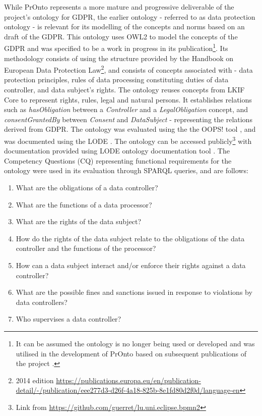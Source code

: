 While PrOnto represents a more mature and progressive deliverable of the project's ontology for GDPR, the earlier ontology - referred to as data protection ontology \cite{otake_using_2017} - is relevant for its modelling of the concepts and norms based on an draft of the GDPR. This ontology uses OWL2 to model the concepts of the GDPR and was specified to be a work in progress in its publication\footnote{It can be assumed the ontology is no longer being used or developed and was utilised in the development of PrOnto based on subsequent publications of the project \cite{bartolini_legal_2018,bartolini_enhancing_2019}.}.
Its methodology consists of using the structure provided by the Handbook on European Data Protection Law\footnote{2014 edition \url{https://publications.europa.eu/en/publication-detail/-/publication/eee277d3-d26f-4a18-825b-8e1fd80d2f0d/language-en}}, and consists of concepts associated with - data protection principles, rules of data processing constituting duties of data controller, and data subject's rights.
The ontology reuses concepts from LKIF Core \cite{hoekstra_lkif_2007} to represent rights, rules, legal and natural persons. It establishes relations such as \textit{hasObligation} between a \textit{Controller} and a \textit{LegalObligation} concept, and \textit{consentGrantedBy} between \textit{Consent} and \textit{DataSubject} - representing the relations derived from GDPR.
The ontology was evaluated using the the OOPS! tool \cite{poveda-villalon_oops!_2014}, and was documented using the LODE \cite{peroni_tools_2013}. The ontology can be accessed publicly\footnote{Link from \cite{otake_using_2017} \url{https://github.com/guerret/lu.uni.eclipse.bpmn2}} with documentation provided using LODE ontology documentation tool \cite{peroni_tools_2013}.
The Competency Questions (CQ) representing functional requirements for the ontology were used in its evaluation through SPARQL queries, and are follows:
\begin{enumerate}
    \item What are the obligations of a data controller?
    \item What are the functions of a data processor?
    \item What are the rights of the data subject?
    \item How do the rights of the data subject relate to the obligations of the data controller and the functions of the processor?
    \item How can a data subject interact and/or enforce their rights against a data controller?
    \item What are the possible fines and sanctions issued in response to violations by data controllers?
    \item Who supervises a data controller?
\end{enumerate}


